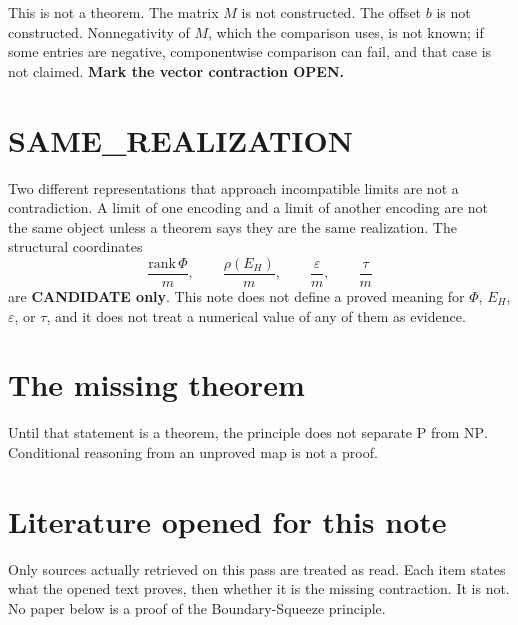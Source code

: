 \documentclass{article}
\begin{document}
This is not a theorem.
The matrix \(M\) is not constructed.
The offset \(b\) is not constructed.
Nonnegativity of \(M\), which the comparison uses, is not known; if some entries are negative, componentwise comparison can fail, and that case is not claimed.
\textbf{Mark the vector contraction OPEN.}

\section{SAME\_REALIZATION}
Two different representations that approach incompatible limits are not a contradiction.
A limit of one encoding and a limit of another encoding are not the same object unless a theorem says they are the same realization.
The structural coordinates
\[
\frac{\mathrm{rank}\,\Phi}{m},\qquad
\frac{\rho(E_H)}{m},\qquad
\frac{\varepsilon}{m},\qquad
\frac{\tau}{m}
\]
are \textbf{CANDIDATE only}.
This note does not define a proved meaning for \(\Phi\), \(E_H\), \(\varepsilon\), or \(\tau\), and it does not treat a numerical value of any of them as evidence.

\section{The missing theorem}
\begin{center}
\end{center}

Until that statement is a theorem, the principle does not separate \(\mathrm{P}\) from \(\mathrm{NP}\).
Conditional reasoning from an unproved map is not a proof.

\section{Literature opened for this note}
Only sources actually retrieved on this pass are treated as read.
Each item states what the opened text proves, then whether it is the missing contraction.
It is not.
No paper below is a proof of the Boundary-Squeeze principle.
\end{document}
